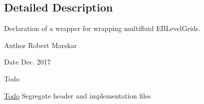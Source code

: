 \subsection{Detailed Description}
Declaration of a wrapper for wrapping multifluid E\+B\+Level\+Grids. 

\begin{DoxyAuthor}{Author}
Robert Marskar 
\end{DoxyAuthor}
\begin{DoxyDate}{Date}
Dec. 2017 
\end{DoxyDate}
\begin{DoxyRefDesc}{Todo}
\item[\hyperlink{todo__todo000005}{Todo}]Segregate header and implementation files \end{DoxyRefDesc}
